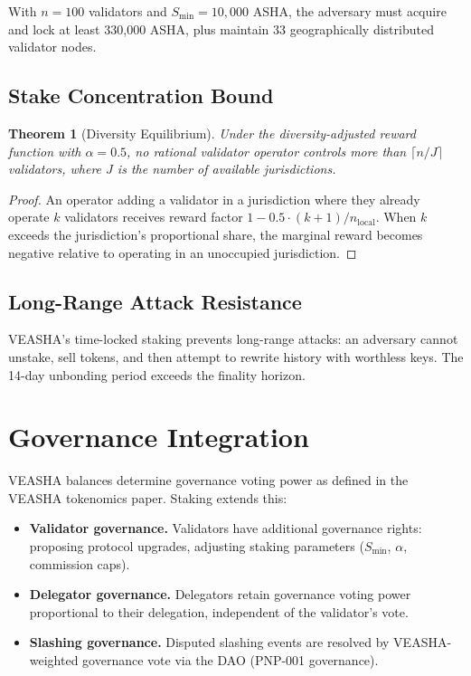 \documentclass[11pt,a4paper]{article}
\newtheorem{theorem}{Theorem}[section]
\begin{document}
With $n = 100$ validators and $S_{\min} = 10{,}000$ ASHA, the
adversary must acquire and lock at least 330{,}000 ASHA, plus maintain
33 geographically distributed validator nodes.

\subsection{Stake Concentration Bound}

\begin{theorem}[Diversity Equilibrium]
    Under the diversity-adjusted reward function with $\alpha = 0.5$,
    no rational validator operator controls more than
    $\lceil n / J \rceil$ validators, where $J$ is the number of
    available jurisdictions.
\end{theorem}

\begin{proof}
    An operator adding a validator in a jurisdiction where they already
    operate $k$ validators receives reward factor
    $1 - 0.5 \cdot (k+1) / n_{\mathrm{local}}$.  When $k$ exceeds the
    jurisdiction's proportional share, the marginal reward becomes
    negative relative to operating in an unoccupied jurisdiction.
\end{proof}

\subsection{Long-Range Attack Resistance}

VEASHA's time-locked staking prevents long-range attacks: an adversary
cannot unstake, sell tokens, and then attempt to rewrite history with
worthless keys.  The 14-day unbonding period exceeds the finality
horizon.

\section{Governance Integration}
\label{sec:governance}

VEASHA balances determine governance voting power as defined in the
VEASHA tokenomics paper.  Staking extends this:

\begin{itemize}
    \item \textbf{Validator governance.}  Validators have additional
    governance rights: proposing protocol upgrades, adjusting staking
    parameters ($S_{\min}$, $\alpha$, commission caps).
    \item \textbf{Delegator governance.}  Delegators retain governance
    voting power proportional to their delegation, independent of the
    validator's vote.
    \item \textbf{Slashing governance.}  Disputed slashing events are
    resolved by VEASHA-weighted governance vote via the DAO (PNP-001
    governance).
\end{itemize}
\end{document}

